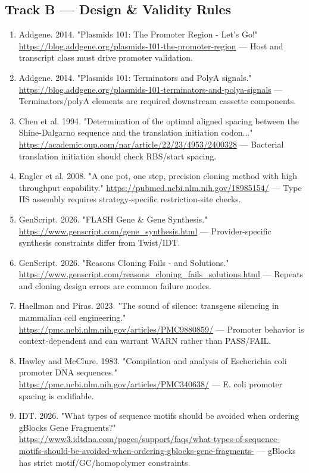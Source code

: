 \documentclass[11pt]{report}
\begin{document}
\subsection{Track B — Design \& Validity Rules}

\begin{enumerate}
\item Addgene. 2014. "Plasmids 101: The Promoter Region - Let's Go!" \url{https://blog.addgene.org/plasmids-101-the-promoter-region} — Host and transcript class must drive promoter validation.
\item Addgene. 2014. "Plasmids 101: Terminators and PolyA signals." \url{https://blog.addgene.org/plasmids-101-terminators-and-polya-signals} — Terminators/polyA elements are required downstream cassette components.
\item Chen et al. 1994. "Determination of the optimal aligned spacing between the Shine-Dalgarno sequence and the translation initiation codon..." \url{https://academic.oup.com/nar/article/22/23/4953/2400328} — Bacterial translation initiation should check RBS/start spacing.
\item Engler et al. 2008. "A one pot, one step, precision cloning method with high throughput capability." \url{https://pubmed.ncbi.nlm.nih.gov/18985154/} — Type IIS assembly requires strategy-specific restriction-site checks.
\item GenScript. 2026. "FLASH Gene \& Gene Synthesis." \url{https://www.genscript.com/gene_synthesis.html} — Provider-specific synthesis constraints differ from Twist/IDT.
\item GenScript. 2026. "Reasons Cloning Fails - and Solutions." \url{https://www.genscript.com/reasons_cloning_fails_solutions.html} — Repeats and cloning design errors are common failure modes.
\item Haellman and Piras. 2023. "The sound of silence: transgene silencing in mammalian cell engineering." \url{https://pmc.ncbi.nlm.nih.gov/articles/PMC9880859/} — Promoter behavior is context-dependent and can warrant WARN rather than PASS/FAIL.
\item Hawley and McClure. 1983. "Compilation and analysis of Escherichia coli promoter DNA sequences." \url{https://pmc.ncbi.nlm.nih.gov/articles/PMC340638/} — E. coli promoter spacing is codifiable.
\item IDT. 2026. "What types of sequence motifs should be avoided when ordering gBlocks Gene Fragments?" \url{https://www3.idtdna.com/pages/support/faqs/what-types-of-sequence-motifs-should-be-avoided-when-ordering-gblocks-gene-fragments-} — gBlocks has strict motif/GC/homopolymer constraints.

\end{enumerate}
\end{document}
